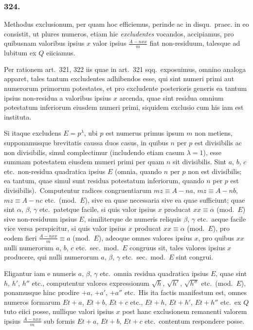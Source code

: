 \documentclass[12pt,a4paper]{article}
\theoremstyle{plain}
\theoremstyle{definition}
\theoremstyle{remark}
\begin{document}
\subsubsection*{324.}

Methodus exclusionum, per quam hoc efficiemus, perinde ac in disqu.\ praec.
in eo consistit, ut plures numeros, etiam hic \emph{excludentes} vocandos,
accipiamus, pro quibusnam valoribus ipsius $x$ valor ipsius
$\frac{A-nxx}{m}$ fiat non-residuum, talesque ad lubitum ex $Q$ eiiciamus.

Per rationem art.\ 321, 322 iis quae in art.\ 321 sqq.\ exposuimus, omnino
analoga apparet, tales tantum excludentes adhibendos esse, qui sint numeri
primi aut numerorum primorum potestates, et pro excludente posterioris
generis ea tantum ipsius non-residua a valoribus ipsius $x$ arcenda, quae sint
residua omnium potestatum inferiorum eiusdem numeri primi, siquidem
exclusio cum his iam est instituta.

Si itaque excludens $E=p^\lambda$, ubi $p$ est numerus primus ipsum $m$ non
metiens, supponamusque brevitatis caussa duos casus, in quibus $n$ per $p$
est divisibilis ac non divisibilis, simul complectimur (includendo etiam casum
$\lambda=1$), esse summam potestatem eiusdem numeri primi per quam $n$ sit
divisibilis. Sint $a$, $b$, $c$ etc.\ non-residua quadratica ipsius $E$ (omnia,
quando $n$ per $p$ non est divisibilis; ea tantum, quae simul sunt residua
potestatum inferiorum, quando $n$ per $p$ est divisibilis).\ Computentur radices
congruentiarum $mz\equiv A-na$, $mz\equiv A-nb$, $mz\equiv A-nc$ etc.\ (mod.\ $E$),
sive ea quae necessaria sive ea quae sufficiunt; quae sint $\alpha$, $\beta$, $\gamma$ etc.\ patetque
facile, si quis valor ipsius $x$ producat $xx\equiv\alpha$ (mod.\ $E$) sive non-residuum
ipsius $E$, similiterque de numeris reliquis $\beta$, $\gamma$ etc.\ aeque facile vice versa
perspicitur, si quis valor ipsius $x$ producat $xx\equiv\alpha$ (mod.\ $E$), pro eodem
fieri $\frac{A-nxx}{m}\equiv a$ (mod.\ $E$), adeoque omnes valores ipsius $x$, pro quibus
$xx$ nulli numerorum $a$, $b$, $c$ etc.\ sec.\ mod.\ $E$ congruus sit, tales valores
ipsius $x$ producere, qui nulli numerorum $a$, $\beta$, $\gamma$ etc.\ sec.\ mod.\ $E$ sint
congrui.

Eligantur iam e numeris $a$, $\beta$, $\gamma$ etc.\ omnia residua quadratica ipsius $E$,
quae sint $h$, $h'$, $h''$ etc., computentur valores expressionum $\sqrt{h}$,
$\sqrt{h'}$, $\sqrt{h''}$ etc.\ (mod.\ $E$), ponamusque hinc prodire $+a$, $+a'$, $+a''$
etc.\ His ita factis manifestum est, omnes numeros formarum
$Et+a$, $Et+b$, $Et+c$ etc., $Et+h$, $Et+h'$, $Et+h''$ etc.\ ex $Q$ tuto eiici
posse, nullique valori ipsius $x$ post hanc exclusionem remanenti valorem
ipsius $\frac{A-nxx}{m}$ sub formis $Et+a$, $Et+b$, $Et+c$ etc.\ contentum respondere
posse.
\end{document}
